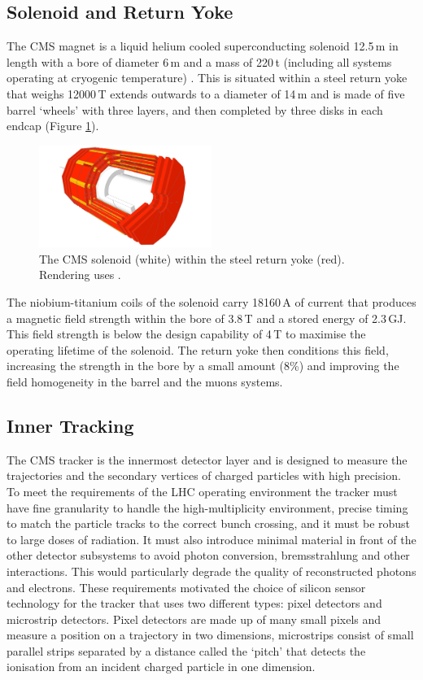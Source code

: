 \subsection{Solenoid and Return Yoke}

The CMS magnet is a liquid helium cooled superconducting solenoid 12.5\,m in length with a bore of diameter 6\,m and a mass of 220\,t (including all systems operating at cryogenic temperature) \cite{CMSPhysics}. 
This is situated within a steel return yoke \cite{Yoke} that weighs 12000\,T extends outwards to a diameter of 14\,m and is made of five barrel `wheels' with three layers, and then completed by three disks in each endcap (Figure \ref{fig:apparatus:solenoid_yoke}).
\begin{figure}[h!]
    \centering
    \includegraphics[width=0.5\textwidth]{figures/apparatus/solenoid_yoke.pdf}
    \caption{The CMS solenoid (white) within the steel return yoke (red). Rendering uses \cite{SketchupCMS}.}
    \label{fig:apparatus:solenoid_yoke}
\end{figure}
The niobium-titanium coils of the solenoid carry 18160\,A of current that produces a magnetic field strength within the bore of 3.8\,T and a stored energy of 2.3\,GJ. 
This field strength is below the design capability of 4\,T to maximise the operating lifetime of the solenoid.
The return yoke then conditions this field, increasing the strength in the bore by a small amount (8\%) \cite{Yoke} and improving the field homogeneity in the barrel and the muons systems. 


\subsection{Inner Tracking}

The CMS tracker \cite{CMSTrackerTDR} is the innermost detector layer and is designed to measure the trajectories and the secondary vertices of charged particles with high precision. 
To meet the requirements of the LHC operating environment the tracker must have fine granularity to handle the high-multiplicity environment, precise timing to match the particle tracks to the correct bunch crossing, and it must be robust to large doses of radiation.
It must also introduce minimal material in front of the other detector subsystems to avoid photon conversion, bremsstrahlung and other interactions. This would particularly degrade the quality of reconstructed photons and electrons. 
These requirements motivated the choice of silicon sensor technology for the tracker that uses two different types: pixel detectors and microstrip detectors. Pixel detectors are made up of many small pixels and measure a position on a trajectory in two dimensions, microstrips consist of small parallel strips separated by a distance called the `pitch' that detects the ionisation from an incident charged particle in one dimension. 


